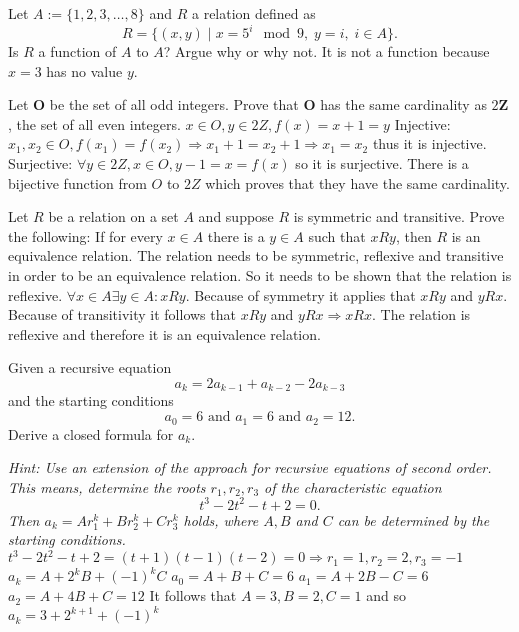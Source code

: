 \documentclass{exercise}
\begin{document}
\subtask Let $A := \{1,2,3,\ldots,8\}$ and $R$ a relation defined as
 \begin{displaymath}
  R = \{(x,y) \; | \; x=5^i\mod 9, \; y= i, \;  i\in A\}. %
 \end{displaymath}%
Is $R$ a function of $A$ to $A$? Argue why or why not.\newline
It is not a function because $x=3$ has no value $y$.

\subtask Let $\textbf{O}$ be the set of all odd integers. Prove that $\textbf{O}$ has the same cardinality as $2\textbf{Z}$, the set of all even integers.\newline
$x\in O, y\in 2Z, f(x)=x+1=y$ \newline
Injective: $x_1,x_2 \in O, f(x_1)=f(x_2) \Rightarrow x_1+1=x_2+1 \Rightarrow x_1=x_2$ thus it is injective.\newline
Surjective: $\forall y \in 2Z,x\in O, y-1=x=f(x)$ so it is surjective.\newline
There is a bijective function from $O$ to $2Z$ which proves that they have the same cardinality.

\subtask Let $R$ be a relation on a set $A$ and suppose $R$ is symmetric and transitive. Prove the following: If for every $x \in A$ there is a $y \in A$ such that $x R y$, then $R$ is an equivalence relation.\newline
The relation needs to be symmetric, reflexive and transitive in order to be an equivalence relation. So it needs to be shown that the relation is reflexive.\newline
$\forall x\in A \exists y\in A:xRy$. Because of symmetry it applies that $xRy$ and $yRx$. Because of transitivity it follows that $xRy$ and $yRx \Rightarrow xRx$. The relation is reflexive and therefore it is an equivalence relation.

Given a recursive equation
\begin{displaymath}
 a_k = 2a_{k-1} + a_{k-2} - 2a_{k-3}
\end{displaymath}
and the starting conditions
\begin{displaymath}
a_0 = 6 \text{ and } a_1 = 6 \text{ and } a_2 = 12.
\end{displaymath}
Derive a closed formula for $a_k$.

\textit{Hint: Use an extension of the approach for recursive equations of second order. This means, determine the roots $r_1,r_2, r_3$ of the characteristic equation $$t^3 - 2t^2 - t + 2 = 0.$$ Then $a_k = Ar_1^k + Br_2^k + Cr_3^k$ holds, where $A, B$ and $C$ can be determined by the starting conditions.}\newline
$t^3-2t^2-t+2=(t+1)(t-1)(t-2)=0\Rightarrow r_1=1,r_2=2,r_3=-1$\newline
$a_k=A+2^kB+(-1)^kC$\newline
$a_0=A+B+C=6$\newline
$a_1=A+2B-C=6$\newline
$a_2=A+4B+C=12$\newline
It follows that $A=3,B=2,C=1$ and so $a_k=3+2^{k+1}+(-1)^k$
\end{document}
